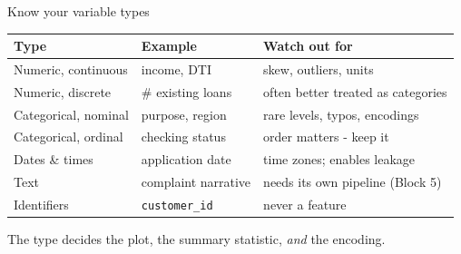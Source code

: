 \documentclass[10pt,aspectratio=169]{beamer}
\begin{document}
\begin{frame}{Know your variable types}
  \small
  \begin{center}
  \begin{tabular}{@{}llp{4.8cm}@{}}
    \toprule
    Type & Example & Watch out for \\
    \midrule
    Numeric, continuous & income, DTI & skew, outliers, units \\
    Numeric, discrete & \# existing loans & often better treated as categories \\
    Categorical, nominal & purpose, region & rare levels, typos, encodings \\
    Categorical, ordinal & checking status & order matters - keep it \\
    Dates \& times & application date & time zones; enables leakage \\
    Text & complaint narrative & needs its own pipeline (Block 5) \\
    Identifiers & \texttt{customer\_id} & \alert{never} a feature \\
    \bottomrule
  \end{tabular}
  \end{center}
  \vspace{0.5em}
  \begin{center}
    The type decides the plot, the summary statistic, \emph{and} the encoding.
  \end{center}
\end{frame}
\end{document}

